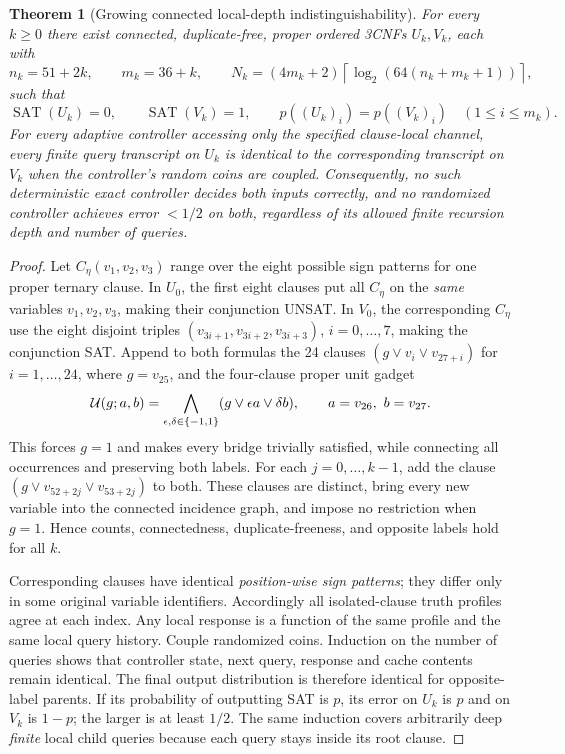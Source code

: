 \documentclass[11pt]{article}
\newtheorem{theorem}{Theorem}
\newcommand{\SAT}{\operatorname{SAT}}
\begin{document}
\begin{theorem}[Growing connected local-depth indistinguishability]
For every \(k\ge0\) there exist connected, duplicate-free, proper ordered 3CNFs \(U_k,V_k\), each with
\[
n_k=51+2k,\qquad m_k=36+k,\qquad
N_k=(4m_k+2)\left\lceil\log_2(64(n_k+m_k+1))\right\rceil,
\]
such that
\[
\SAT(U_k)=0,\qquad \SAT(V_k)=1,\qquad
p((U_k)_i)=p((V_k)_i)\quad(1\le i\le m_k).
\]
For every adaptive controller accessing only the specified clause-local channel, every finite query transcript on \(U_k\) is identical to the corresponding transcript on \(V_k\) when the controller's random coins are coupled. Consequently, no such deterministic exact controller decides both inputs correctly, and no randomized controller achieves error \(<1/2\) on both, regardless of its allowed finite recursion depth and number of queries.
\end{theorem}
\begin{proof}
Let \(C_\eta(v_1,v_2,v_3)\) range over the eight possible sign patterns for one proper ternary clause. In \(U_0\), the first eight clauses put all \(C_\eta\) on the \emph{same} variables \(v_1,v_2,v_3\), making their conjunction UNSAT. In \(V_0\), the corresponding \(C_\eta\) use the eight disjoint triples \((v_{3i+1},v_{3i+2},v_{3i+3})\), \(i=0,\ldots,7\), making the conjunction SAT. Append to both formulas the 24 clauses \((g\vee v_i\vee v_{27+i})\) for \(i=1,\ldots,24\), where \(g=v_{25}\), and the four-clause proper unit gadget
\[
{\cal U}(g;a,b)=\bigwedge_{\epsilon,\delta\in\{-1,1\}}
(g\vee \epsilon a\vee\delta b),\qquad a=v_{26},\ b=v_{27}.
\]
This forces \(g=1\) and makes every bridge trivially satisfied, while connecting all occurrences and preserving both labels. For each \(j=0,\ldots,k-1\), add the clause
\((g\vee v_{52+2j}\vee v_{53+2j})\) to both. These clauses are distinct, bring every new variable into the connected incidence graph, and impose no restriction when \(g=1\). Hence counts, connectedness, duplicate-freeness, and opposite labels hold for all \(k\).

Corresponding clauses have identical \emph{position-wise sign patterns}; they differ only in some original variable identifiers. Accordingly all isolated-clause truth profiles agree at each index. Any local response is a function of the same profile and the same local query history. Couple randomized coins. Induction on the number of queries shows that controller state, next query, response and cache contents remain identical. The final output distribution is therefore identical for opposite-label parents. If its probability of outputting SAT is \(p\), its error on \(U_k\) is \(p\) and on \(V_k\) is \(1-p\); the larger is at least \(1/2\). The same induction covers arbitrarily deep \emph{finite} local child queries because each query stays inside its root clause.
\end{proof}
\end{document}
